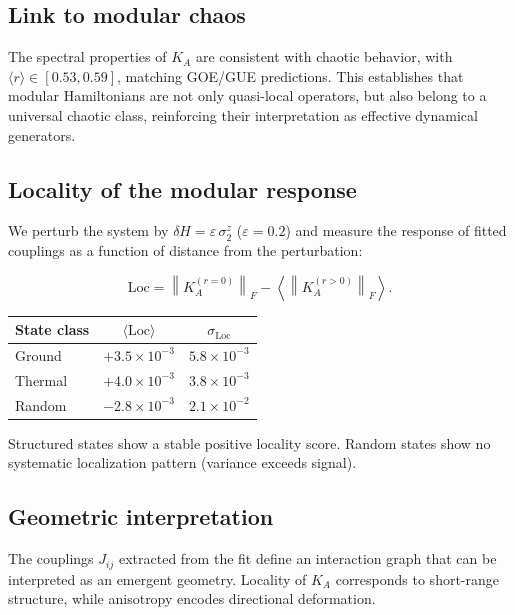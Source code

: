 \documentclass[11pt]{article}
\begin{document}
\subsection{Link to modular chaos}

The spectral properties of $K_A$ are consistent with chaotic behavior,
with $\langle r \rangle \in [0.53, 0.59]$, matching GOE/GUE predictions.
This establishes that modular Hamiltonians are not only quasi-local
operators, but also belong to a universal chaotic class, reinforcing
their interpretation as effective dynamical generators.

\subsection{Locality of the modular response}

We perturb the system by $\delta H = \varepsilon\,\sigma_2^z$
($\varepsilon = 0.2$) and measure the response of fitted couplings
as a function of distance from the perturbation:

\[
\mathrm{Loc} = \left\|K_A^{(r=0)}\right\|_F
- \left\langle \left\|K_A^{(r>0)}\right\|_F \right\rangle.
\]

\begin{center}
\begin{tabular}{lcc}
\toprule
State class & $\langle\mathrm{Loc}\rangle$ & $\sigma_{\mathrm{Loc}}$ \\
\midrule
Ground  & $+3.5 \times 10^{-3}$ & $5.8 \times 10^{-3}$ \\
Thermal & $+4.0 \times 10^{-3}$ & $3.8 \times 10^{-3}$ \\
Random  & $-2.8 \times 10^{-3}$ & $2.1 \times 10^{-2}$ \\
\bottomrule
\end{tabular}
\end{center}

Structured states show a stable positive locality score. Random states
show no systematic localization pattern (variance exceeds signal).

\subsection{Geometric interpretation}

The couplings $J_{ij}$ extracted from the fit define an interaction
graph that can be interpreted as an emergent geometry. Locality of
$K_A$ corresponds to short-range structure, while anisotropy encodes
directional deformation.
\end{document}
